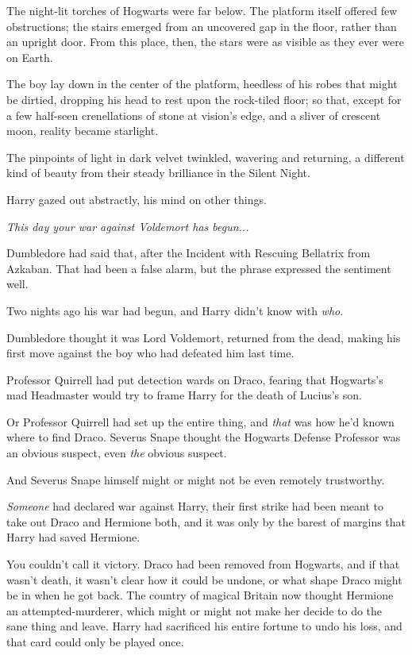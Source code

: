 The night-lit torches of Hogwarts were far below. The platform itself
offered few obstructions; the stairs emerged from an uncovered gap in
the floor, rather than an upright door. From this place, then, the stars
were as visible as they ever were on Earth.

The boy lay down in the center of the platform, heedless of his robes
that might be dirtied, dropping his head to rest upon the rock-tiled
floor; so that, except for a few half-seen crenellations of stone at
vision's edge, and a sliver of crescent moon, reality became starlight.

The pinpoints of light in dark velvet twinkled, wavering and returning,
a different kind of beauty from their steady brilliance in the Silent
Night.

Harry gazed out abstractly, his mind on other things.

\emph{This day your war against Voldemort has begun...}

Dumbledore had said that, after the Incident with Rescuing Bellatrix
from Azkaban. That had been a false alarm, but the phrase expressed the
sentiment well.

Two nights ago his war had begun, and Harry didn't know with \emph{who}.

Dumbledore thought it was Lord Voldemort, returned from the dead, making
his first move against the boy who had defeated him last time.

Professor Quirrell had put detection wards on Draco, fearing that
Hogwarts's mad Headmaster would try to frame Harry for the death of
Lucius's son.

Or Professor Quirrell had set up the entire thing, and \emph{that} was
how he'd known where to find Draco. Severus Snape thought the Hogwarts
Defense Professor was an obvious suspect, even \emph{the} obvious
suspect.

And Severus Snape himself might or might not be even remotely
trustworthy.

\emph{Someone} had declared war against Harry, their first strike had
been meant to take out Draco and Hermione both, and it was only by the
barest of margins that Harry had saved Hermione.

You couldn't call it victory. Draco had been removed from Hogwarts, and
if that wasn't death, it wasn't clear how it could be undone, or what
shape Draco might be in when he got back. The country of magical Britain
now thought Hermione an attempted-murderer, which might or might not
make her decide to do the sane thing and leave. Harry had sacrificed his
entire fortune to undo his loss, and that card could only be played
once.


